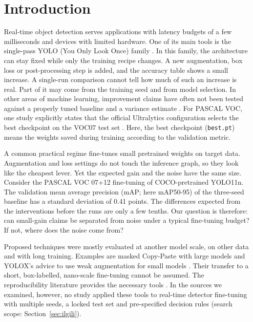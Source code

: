 \documentclass[pdflatex,iicol,sn-mathphys-num]{sn-jnl}
\begin{document}
\maketitle

\section{Introduction}\label{sec:giris}

Real-time object detection serves applications with latency budgets of a few milliseconds and devices with limited hardware. One of its main tools is the single-pass YOLO (You Only Look Once) family \cite{redmon_2016_yolo,jocher_2024_yolo11}. In this family, the architecture can stay fixed while only the training recipe changes. A new augmentation, box loss or post-processing step is added, and the accuracy table shows a small increase. A single-run comparison cannot tell how much of such an increase is real. Part of it may come from the training seed and from model selection. In other areas of machine learning, improvement claims have often not been tested against a properly tuned baseline and a variance estimate \cite{lipton_2019_troubling}. For PASCAL VOC, one study explicitly states that the official Ultralytics configuration selects the best checkpoint on the VOC07 test set \cite{lin_2026_yolopeft}. Here, the best checkpoint (\texttt{best.pt}) means the weights saved during training according to the validation metric.

A common practical regime fine-tunes small pretrained weights on target data. Augmentation and loss settings do not touch the inference graph, so they look like the cheapest lever. Yet the expected gain and the noise have the same size. Consider the PASCAL VOC 07+12 fine-tuning of COCO-pretrained YOLO11n. The validation mean average precision (mAP; here mAP50-95) of the three-seed baseline has a standard deviation of 0.41 points. The differences expected from the interventions before the runs are only a few tenths. Our question is therefore: can small-gain claims be separated from noise under a typical fine-tuning budget? If not, where does the noise come from?

Proposed techniques were mostly evaluated at another model scale, on other data and with long training. Examples are masked Copy-Paste with large models \cite{ghiasi_2021_copypaste} and YOLOX's advice to use weak augmentation for small models \cite{ge_2021_yolox}. Their transfer to a short, box-labelled, nano-scale fine-tuning cannot be assumed. The reproducibility literature provides the necessary tools \cite{bouthillier_2021_variance,picard_2021_seed}. In the sources we examined, however, no study applied these tools to real-time detector fine-tuning with multiple seeds, a locked test set and pre-specified decision rules (search scope: Section~\ref{sec:ilgili}).
\end{document}
